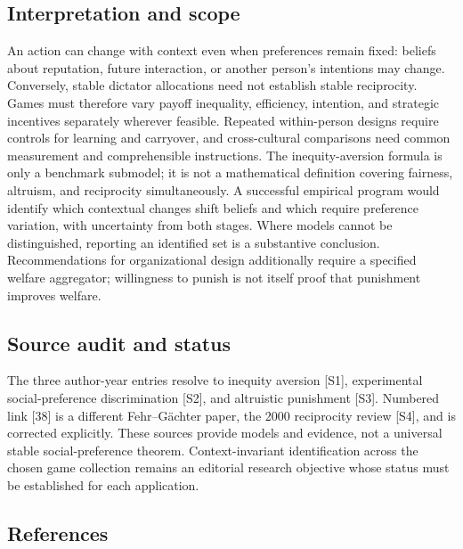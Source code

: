 \documentclass[11pt,a4paper]{article}
\begin{document}
\subsection*{Interpretation and scope}

An action can change with context even when preferences remain fixed: beliefs about reputation, future interaction, or another person's intentions may change. Conversely, stable dictator allocations need not establish stable reciprocity. Games must therefore vary payoff inequality, efficiency, intention, and strategic incentives separately wherever feasible. Repeated within-person designs require controls for learning and carryover, and cross-cultural comparisons need common measurement and comprehensible instructions. The inequity-aversion formula is only a benchmark submodel; it is not a mathematical definition covering fairness, altruism, and reciprocity simultaneously. A successful empirical program would identify which contextual changes shift beliefs and which require preference variation, with uncertainty from both stages. Where models cannot be distinguished, reporting an identified set is a substantive conclusion. Recommendations for organizational design additionally require a specified welfare aggregator; willingness to punish is not itself proof that punishment improves welfare.

\subsection*{Source audit and status}

The three author-year entries resolve to inequity aversion [S1], experimental social-preference discrimination [S2], and altruistic punishment [S3]. Numbered link [38] is a different Fehr--Gächter paper, the 2000 reciprocity review [S4], and is corrected explicitly. These sources provide models and evidence, not a universal stable social-preference theorem. Context-invariant identification across the chosen game collection remains an editorial research objective whose status must be established for each application.

\subsection*{References}
\end{document}
